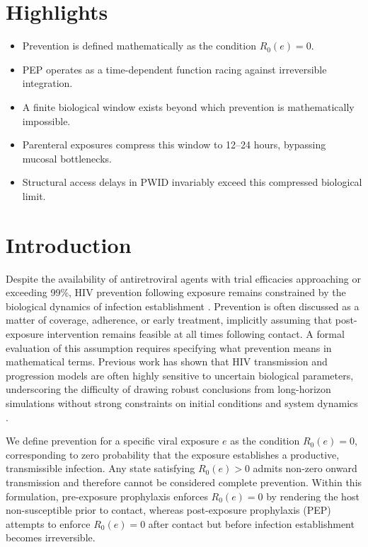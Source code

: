 \documentclass[12pt]{article}
\begin{document}
\section*{Highlights}
\begin{itemize}
    \item Prevention is defined mathematically as the condition $R_0(e)=0$.
    \item PEP operates as a time-dependent function racing against irreversible integration.
    \item A finite biological window exists beyond which prevention is mathematically impossible.
    \item Parenteral exposures compress this window to 12--24 hours, bypassing mucosal bottlenecks.
    \item Structural access delays in PWID invariably exceed this compressed biological limit.
\end{itemize}

\section{Introduction}

Despite the availability of antiretroviral agents with trial efficacies approaching or exceeding 99\%, HIV prevention following exposure remains constrained by the biological dynamics of infection establishment \cite{grant_preexposure_2010, anderson_emtricitabine-tenofovir_2012}. Prevention is often discussed as a matter of coverage, adherence, or early treatment, implicitly assuming that post-exposure intervention remains feasible at all times following contact. A formal evaluation of this assumption requires specifying what prevention means in mathematical terms. Previous work has shown that HIV transmission and progression models are often highly sensitive to uncertain biological parameters, underscoring the difficulty of drawing robust conclusions from long-horizon simulations without strong constraints on initial conditions and system dynamics \cite{BlowerDowlatabadi1994}.

We define prevention for a specific viral exposure $e$ as the condition $R_0(e)=0$, corresponding to zero probability that the exposure establishes a productive, transmissible infection. Any state satisfying $R_0(e)>0$ admits non-zero onward transmission and therefore cannot be considered complete prevention. Within this formulation, pre-exposure prophylaxis enforces $R_0(e)=0$ by rendering the host non-susceptible prior to contact, whereas post-exposure prophylaxis (PEP) attempts to enforce $R_0(e)=0$ after contact but before infection establishment becomes irreversible.
\end{document}
